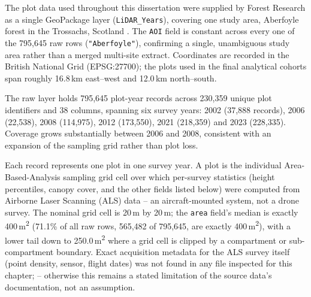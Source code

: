 The plot data used throughout this dissertation were supplied by Forest Research as a single
GeoPackage layer (\texttt{LiDAR\_Years}), covering one study area, Aberfoyle forest in the
Trossachs, Scotland . The \texttt{AOI} field is constant across every one of
the 795,645 raw rows (\texttt{"Aberfoyle"}), confirming a single, unambiguous study area rather
than a merged multi-site extract. Coordinates are recorded in the British National Grid
(EPSG:27700); the plots used in the final analytical cohorts span roughly 16.8\,km east--west and
12.0\,km north--south.

The raw layer holds 795,645 plot-year records across 230,359 unique plot identifiers and 38
columns, spanning six survey years: 2002 (37,888 records), 2006 (22,538), 2008 (114,975), 2012
(173,550), 2021 (218,359) and 2023 (228,335). Coverage grows substantially between 2006 and 2008,
consistent with an expansion of the sampling grid rather than plot loss.

Each record represents one plot in one survey year. A plot is the individual Area-Based-Analysis
sampling grid cell over which per-survey statistics (height percentiles, canopy cover, and the
other fields listed below) were computed from Airborne Laser Scanning (ALS) data -- an
aircraft-mounted system, not a drone survey. The nominal grid cell is 20\,m by 20\,m; the
\texttt{area} field's median is exactly 400\,m\textsuperscript{2} (71.1\% of all raw rows,
565,482 of 795,645, are exactly 400\,m\textsuperscript{2}), with a lower tail down to
250.0\,m\textsuperscript{2} where a grid cell is clipped by a compartment or sub-compartment
boundary.  Exact
acquisition metadata for the ALS survey itself (point density, sensor, flight dates) was not found
in any file inspected for this chapter;  -- otherwise this remains a stated limitation of the source data's
documentation, not an assumption.

